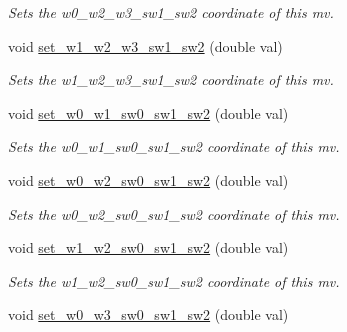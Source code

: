 \begin{DoxyCompactItemize}
\begin{DoxyCompactList}\small\item\em Sets the w0\-\_\-w2\-\_\-w3\-\_\-sw1\-\_\-sw2 coordinate of this mv. \end{DoxyCompactList}\item 
\hypertarget{classe3ga_1_1mv_ae5c7bc4fcf60edc87842ee66480f0ba4}{void \hyperlink{classe3ga_1_1mv_ae5c7bc4fcf60edc87842ee66480f0ba4}{set\-\_\-w1\-\_\-w2\-\_\-w3\-\_\-sw1\-\_\-sw2} (double val)}\label{classe3ga_1_1mv_ae5c7bc4fcf60edc87842ee66480f0ba4}

\begin{DoxyCompactList}\small\item\em Sets the w1\-\_\-w2\-\_\-w3\-\_\-sw1\-\_\-sw2 coordinate of this mv. \end{DoxyCompactList}\item 
\hypertarget{classe3ga_1_1mv_a5cf4b8afd53c23bbbc62d00ede1061dc}{void \hyperlink{classe3ga_1_1mv_a5cf4b8afd53c23bbbc62d00ede1061dc}{set\-\_\-w0\-\_\-w1\-\_\-sw0\-\_\-sw1\-\_\-sw2} (double val)}\label{classe3ga_1_1mv_a5cf4b8afd53c23bbbc62d00ede1061dc}

\begin{DoxyCompactList}\small\item\em Sets the w0\-\_\-w1\-\_\-sw0\-\_\-sw1\-\_\-sw2 coordinate of this mv. \end{DoxyCompactList}\item 
\hypertarget{classe3ga_1_1mv_ab405e00ae90e6ee56944b4976845dce1}{void \hyperlink{classe3ga_1_1mv_ab405e00ae90e6ee56944b4976845dce1}{set\-\_\-w0\-\_\-w2\-\_\-sw0\-\_\-sw1\-\_\-sw2} (double val)}\label{classe3ga_1_1mv_ab405e00ae90e6ee56944b4976845dce1}

\begin{DoxyCompactList}\small\item\em Sets the w0\-\_\-w2\-\_\-sw0\-\_\-sw1\-\_\-sw2 coordinate of this mv. \end{DoxyCompactList}\item 
\hypertarget{classe3ga_1_1mv_afdb46273cfbc4638b0a9be56374feafa}{void \hyperlink{classe3ga_1_1mv_afdb46273cfbc4638b0a9be56374feafa}{set\-\_\-w1\-\_\-w2\-\_\-sw0\-\_\-sw1\-\_\-sw2} (double val)}\label{classe3ga_1_1mv_afdb46273cfbc4638b0a9be56374feafa}

\begin{DoxyCompactList}\small\item\em Sets the w1\-\_\-w2\-\_\-sw0\-\_\-sw1\-\_\-sw2 coordinate of this mv. \end{DoxyCompactList}\item 
\hypertarget{classe3ga_1_1mv_a9d3823fb310e6734c61fc64cb2b9bfcd}{void \hyperlink{classe3ga_1_1mv_a9d3823fb310e6734c61fc64cb2b9bfcd}{set\-\_\-w0\-\_\-w3\-\_\-sw0\-\_\-sw1\-\_\-sw2} (double val)}\label{classe3ga_1_1mv_a9d3823fb310e6734c61fc64cb2b9bfcd}


\end{DoxyCompactItemize}
